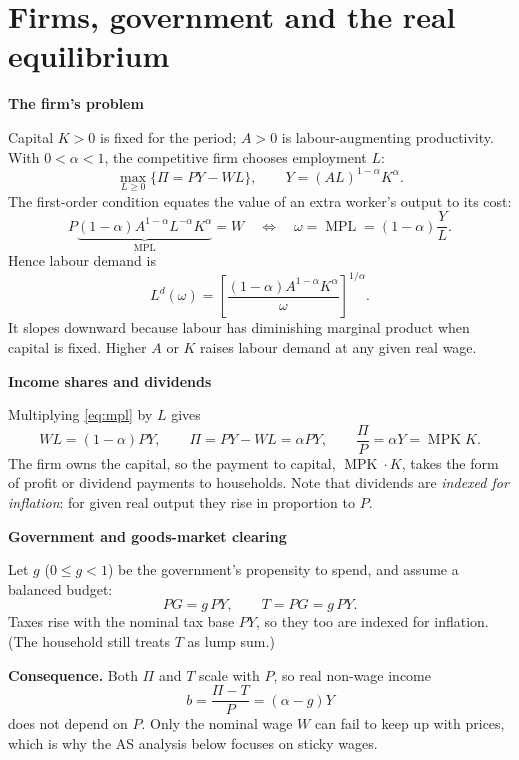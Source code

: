 \documentclass[11pt,letterpaper]{article}
\newcommand{\topic}[1]{\par\Needspace{4\baselineskip}\medskip\textbf{#1}\par\nobreak}
\newcommand{\w}{\omega}
\newcommand{\mpl}{\operatorname{MPL}}
\newcommand{\mpk}{\operatorname{MPK}}
\begin{document}
\section{Firms, government and the real equilibrium}
\topic{The firm's problem}
Capital $K>0$ is fixed for the period; $A>0$ is labour-augmenting productivity.
With $0<\alpha<1$, the competitive firm chooses employment $L$:
\begin{equation}
 \max_{L\geq0}\{\Pi=PY-WL\},\qquad
 Y=(AL)^{1-\alpha}K^\alpha.
 \label{eq:firm}
\end{equation}
The first-order condition equates the value of an extra worker's output to its cost:
\begin{equation}
 P\underbrace{(1-\alpha)A^{1-\alpha}L^{-\alpha}K^\alpha}_{\mpl}
   =W
 \quad\Longleftrightarrow\quad
 \w=\mpl=(1-\alpha)\frac{Y}{L}.
 \label{eq:mpl}
\end{equation}
Hence labour demand is
\begin{equation}
 \boxed{L^d(\w)=\left[\frac{(1-\alpha)A^{1-\alpha}K^\alpha}{\w}\right]^{1/\alpha}.}
 \label{eq:ld}
\end{equation}
It slopes downward because labour has diminishing marginal product when capital
is fixed. Higher $A$ or $K$ raises labour demand at any given real wage.

\topic{Income shares and dividends}
Multiplying \eqref{eq:mpl} by $L$ gives
\begin{equation}
 WL=(1-\alpha)PY,\qquad
 \Pi=PY-WL=\alpha PY,\qquad \frac{\Pi}{P}=\alpha Y=\mpk K.
 \label{eq:shares}
\end{equation}
The firm owns the capital, so the payment to capital, $\mpk\cdot K$, takes the
form of profit or dividend payments to households. Note that dividends are
\emph{indexed for inflation}: for given real output they rise in proportion to $P$.

\topic{Government and goods-market clearing}
Let $g$ ($0\leq g<1$) be the government's propensity to spend, and assume a
balanced budget:
\begin{equation}
 PG=g\,PY,\qquad T=PG=g\,PY.
 \label{eq:government}
\end{equation}
Taxes rise with the nominal tax base $PY$, so they too are indexed for inflation.
(The household still treats $T$ as lump sum.)

\textbf{Consequence.} Both $\Pi$ and $T$ scale with $P$, so real non-wage income
\[
 b=\frac{\Pi-T}{P}=(\alpha-g)Y
\]
does not depend on $P$. Only the nominal wage $W$ can fail to keep up with prices,
which is why the AS analysis below focuses on sticky wages.
\end{document}
